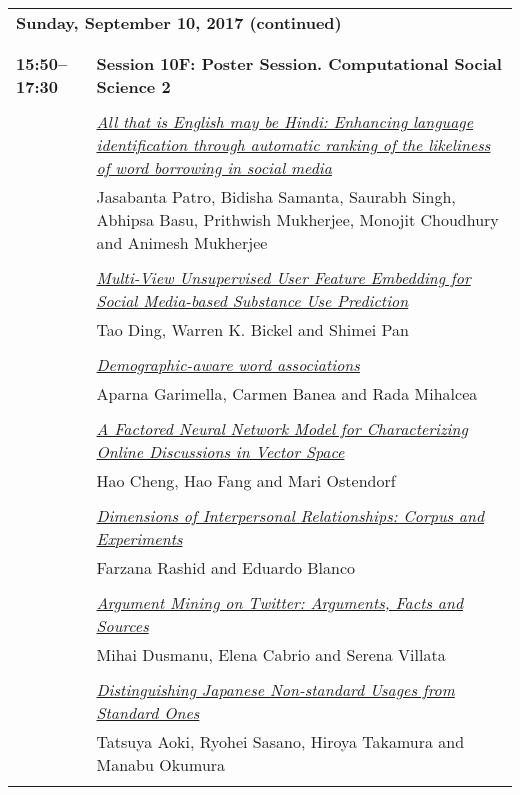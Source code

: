 \begin{tabular}{p{20mm}p{128mm}}
\\
\multicolumn{2}{l}{\bf Sunday, September 10, 2017 (continued)} \\\\
\\{\bf 15:50--17:30} & {\bf Session 10F: Poster Session. Computational Social Science 2 } \\
\\
 & \hyperlink{page.2247}{\em All that is English may be Hindi: Enhancing language identification through automatic ranking of the likeliness of word borrowing in social media}\\
         & Jasabanta Patro, Bidisha Samanta, Saurabh Singh, Abhipsa Basu, Prithwish Mukherjee, Monojit Choudhury and Animesh Mukherjee \\
\\

 & \hyperlink{page.2258}{\em Multi-View Unsupervised User Feature Embedding for Social Media-based Substance Use Prediction}\\
         & Tao Ding, Warren K. Bickel and Shimei Pan \\
\\

 & \hyperlink{page.2268}{\em Demographic-aware word associations}\\
         & Aparna Garimella, Carmen Banea and Rada Mihalcea \\
\\

 & \hyperlink{page.2279}{\em A Factored Neural Network Model for Characterizing Online Discussions in Vector Space}\\
         & Hao Cheng, Hao Fang and Mari Ostendorf \\
\\

 & \hyperlink{page.2290}{\em Dimensions of Interpersonal Relationships: Corpus and Experiments}\\
         & Farzana Rashid and Eduardo Blanco \\
\\

 & \hyperlink{page.2300}{\em Argument Mining on Twitter: Arguments, Facts and Sources}\\
         & Mihai Dusmanu, Elena Cabrio and Serena Villata \\
\\

 & \hyperlink{page.2306}{\em Distinguishing Japanese Non-standard Usages from Standard Ones}\\
         & Tatsuya Aoki, Ryohei Sasano, Hiroya Takamura and Manabu Okumura \\
\\


\end{tabular}
